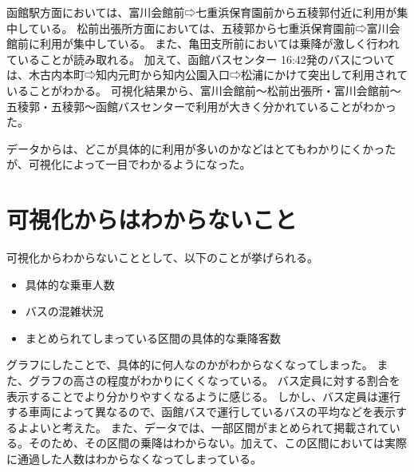 \documentclass[a4paper,twocolumn,11pt]{ltjsarticle}
\begin{document}
函館駅方面においては、富川会館前⇨七重浜保育園前から五稜郭付近に利用が集中している。
松前出張所方面においては、五稜郭から七重浜保育園前⇨富川会館前に利用が集中している。
また、亀田支所前においては乗降が激しく行われていることが読み取れる。
加えて、函館バスセンター 16:42発のバスについては、木古内本町⇨知内元町から知内公園入口⇨松浦にかけて突出して利用されていることがわかる。
可視化結果から、富川会館前～松前出張所・富川会館前～五稜郭・五稜郭～函館バスセンターで利用が大きく分かれていることがわかった。

データからは、どこが具体的に利用が多いのかなどはとてもわかりにくかったが、可視化によって一目でわかるようになった。

\section{可視化からはわからないこと}

可視化からわからないこととして、以下のことが挙げられる。

\begin{itemize}
    \item 具体的な乗車人数
    \item バスの混雑状況
    \item まとめられてしまっている区間の具体的な乗降客数
\end{itemize}

グラフにしたことで、具体的に何人なのかがわからなくなってしまった。
また、グラフの高さの程度がわかりにくくなっている。
バス定員に対する割合を表示することでより分かりやすくなるように感じる。
しかし、バス定員は運行する車両によって異なるので、函館バスで運行しているバスの平均などを表示するよよいと考えた。
また、データでは、一部区間がまとめられて掲載されている。そのため、その区間の乗降はわからない。加えて、この区間においては実際に通過した人数はわからなくなってしまっている。
\end{document}
